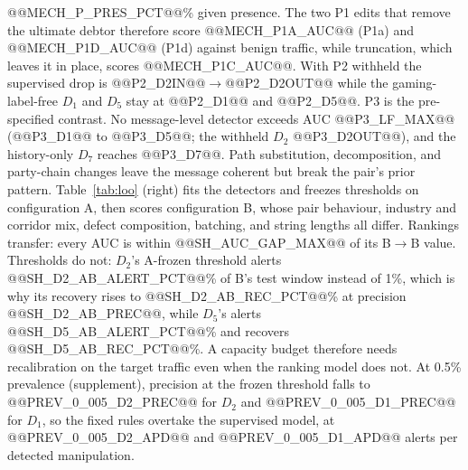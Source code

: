 \documentclass[conference]{IEEEtran}
\begin{document}
@@MECH_P_PRES_PCT@@\% given presence. The two P1 edits that remove the
ultimate debtor therefore score @@MECH_P1A_AUC@@ (P1a) and @@MECH_P1D_AUC@@
(P1d) against benign traffic, while truncation, which leaves it in place,
scores @@MECH_P1C_AUC@@. With P2 withheld the supervised drop is
@@P2_D2IN@@$\rightarrow$@@P2_D2OUT@@ while the gaming-label-free $D_1$ and $D_5$
stay at @@P2_D1@@ and @@P2_D5@@. P3 is the pre-specified contrast. No
message-level detector exceeds AUC @@P3_LF_MAX@@ (@@P3_D1@@ to @@P3_D5@@; the
withheld $D_2$ @@P3_D2OUT@@), and the history-only $D_7$ reaches @@P3_D7@@.
Path substitution, decomposition, and party-chain changes leave the message
coherent but break the pair's prior pattern. Table~\ref{tab:loo} (right) fits the detectors and freezes thresholds on
configuration A, then scores configuration B, whose pair behaviour, industry
and corridor mix, defect composition, batching, and string lengths all
differ. Rankings transfer: every AUC is within @@SH_AUC_GAP_MAX@@ of its
B$\rightarrow$B value. Thresholds do not: $D_2$'s A-frozen threshold alerts
@@SH_D2_AB_ALERT_PCT@@\% of B's test window instead of 1\%, which is why its
recovery rises to @@SH_D2_AB_REC_PCT@@\% at precision @@SH_D2_AB_PREC@@,
while $D_5$'s alerts @@SH_D5_AB_ALERT_PCT@@\% and recovers
@@SH_D5_AB_REC_PCT@@\%. A capacity budget therefore needs recalibration on
the target traffic even when the ranking model does not. At 0.5\% prevalence
(supplement), precision at the frozen threshold falls to
@@PREV_0_005_D2_PREC@@ for $D_2$ and @@PREV_0_005_D1_PREC@@ for $D_1$, so the
fixed rules overtake the supervised model, at @@PREV_0_005_D2_APD@@ and
@@PREV_0_005_D1_APD@@ alerts per detected manipulation.
\end{document}

